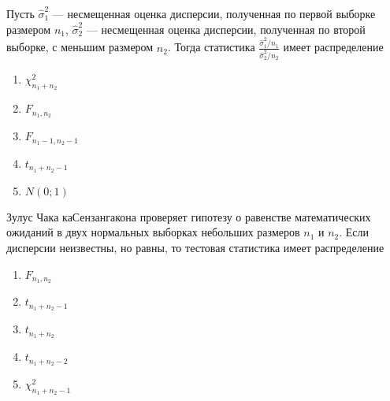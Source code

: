 \documentclass[t]{beamer}
\begin{document}
 \begin{frame} \label{55} 
\begin{block}{55} 

Пусть  $\hat{\sigma}^2_1$ — несмещенная оценка дисперсии, полученная по первой выборке размером $n_1$,   $\hat{\sigma}^2_2$ — несмещенная оценка дисперсии, полученная по второй выборке, с меньшим размером  $n_2$. Тогда статистика $\frac{\hat{\sigma}^2_1/n_1}{\hat{\sigma}^2_2/n_2}$  имеет распределение
 


 \end{block} 
\begin{enumerate} 
\item[] \hyperlink{55-No}{\beamergotobutton{} $\chi^2_{n_1+n_2}$}
\item[] \hyperlink{55-No}{\beamergotobutton{} $F_{n_1,n_2}$}
\item[] \hyperlink{55-No}{\beamergotobutton{} $F_{n_1-1,n_2-1}$}
\item[] \hyperlink{55-No}{\beamergotobutton{} $t_{n_1+n_2-1}$}
\item[] \hyperlink{55-No}{\beamergotobutton{} $N(0;1)$}
\end{enumerate} 
\end{frame} 


 \begin{frame} \label{56} 
\begin{block}{56} 

Зулус Чака каСензангакона проверяет гипотезу  о равенстве математических ожиданий в двух нормальных выборках небольших размеров $n_1$   и  $n_2$. Если дисперсии неизвестны, но равны, то тестовая статистика имеет распределение
 


 \end{block} 
\begin{enumerate} 
\item[] \hyperlink{56-No}{\beamergotobutton{} $F_{n_1,n_2}$}
\item[] \hyperlink{56-Yes}{\beamergotobutton{} $t_{n_1+n_2-1}$}
\item[] \hyperlink{56-No}{\beamergotobutton{} $t_{n_1+n_2}$}
\item[] \hyperlink{56-No}{\beamergotobutton{} $t_{n_1+n_2-2}$}
\item[] \hyperlink{56-No}{\beamergotobutton{} $\chi^2_{n_1+n_2-1}$}
\end{enumerate} 
\end{frame} 
\end{document}
